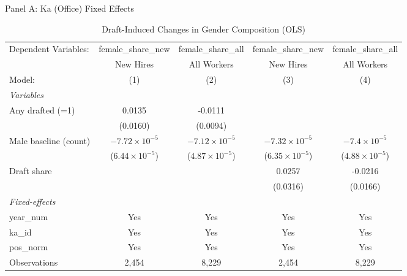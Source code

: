 \begin{table}[htbp]
\centering
\begin{threeparttable}
\caption{Draft-Induced Changes in Gender Composition (OLS)}
\label{tab:gender-composition}
\small
Panel A: Ka (Office) Fixed Effects\\[1ex]
\begingroup
\centering
\begin{tabular}{lcccc}
   \tabularnewline \midrule \midrule
   Dependent Variables:  & female\_share\_new      & female\_share\_all      & female\_share\_new      & female\_share\_all\\    
                         & New Hires               & All Workers             & New Hires               & All Workers \\   
   Model:                & (1)                     & (2)                     & (3)                     & (4)\\  
   \midrule
   \emph{Variables}\\
   Any drafted (=1)      & 0.0135                  & -0.0111                 &                         &   \\   
                         & (0.0160)                & (0.0094)                &                         &   \\   
   Male baseline (count) & $-7.72\times 10^{-5}$   & $-7.12\times 10^{-5}$   & $-7.32\times 10^{-5}$   & $-7.4\times 10^{-5}$\\    
                         & ($6.44\times 10^{-5}$)  & ($4.87\times 10^{-5}$)  & ($6.35\times 10^{-5}$)  & ($4.88\times 10^{-5}$)\\    
   Draft share           &                         &                         & 0.0257                  & -0.0216\\   
                         &                         &                         & (0.0316)                & (0.0166)\\   
   \midrule
   \emph{Fixed-effects}\\
   year\_num             & Yes                     & Yes                     & Yes                     & Yes\\  
   ka\_id                & Yes                     & Yes                     & Yes                     & Yes\\  
   pos\_norm             & Yes                     & Yes                     & Yes                     & Yes\\  
   \midrule
   Observations          & 2,454                   & 8,229                   & 2,454                   & 8,229\\  

\end{tabular}
\end{threeparttable}
\end{table}
